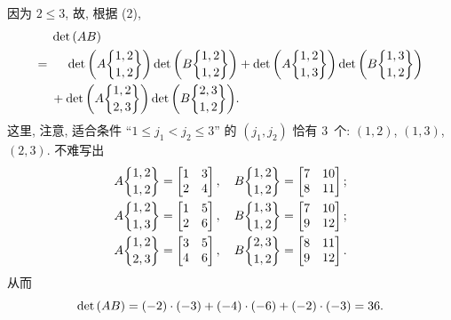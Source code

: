 \documentclass[../libro.tex]{subfiles}
\begin{document}
\begin{example}
    因为 \(2 \leq 3\), 故, 根据 (2),
    \begin{align*}
        & \det {(AB)}
        \\
        = {} &
        \hphantom{{} + {}}
        \det {\left(A\submat{1,2}{1,2}\right)}
        \det {\left(B\submat{1,2}{1,2}\right)}
        + \det {\left(A\submat{1,2}{1,3}\right)}
        \det {\left(B\submat{1,3}{1,2}\right)}
        \\
        &
        + \det {\left(A\submat{1,2}{2,3}\right)}
        \det {\left(B\submat{2,3}{1,2}\right)}.
    \end{align*}
    这里, 注意, 适合条件
    ``\(1 \leq j_1 < j_2 \leq 3\)''
    的 \((j_1, j_2)\)
    恰有 \(3\)~个:
    \((1, 2)\), \((1, 3)\), \((2, 3)\).
    不难写出
    \begin{align*}
        & A\submat{1,2}{1,2} =
        \begin{bmatrix}
            1&3\\2&4\\
        \end{bmatrix},
        \quad
        B\submat{1,2}{1,2} =
        \begin{bmatrix}
            7&10\\8&11\\
        \end{bmatrix}; \\
        & A\submat{1,2}{1,3} =
        \begin{bmatrix}
            1&5\\2&6\\
        \end{bmatrix},
        \quad
        B\submat{1,3}{1,2} =
        \begin{bmatrix}
            7&10\\9&12\\
        \end{bmatrix}; \\
        & A\submat{1,2}{2,3} =
        \begin{bmatrix}
            3&5\\4&6\\
        \end{bmatrix},
        \quad
        B\submat{2,3}{1,2} =
        \begin{bmatrix}
            8&11\\9&12\\
        \end{bmatrix}.
    \end{align*}
    从而
    \begin{equation*}
        \det {(AB)}
        = (-2) \cdot (-3) + (-4) \cdot (-6) + (-2) \cdot (-3)
        = 36.
        \qedhere
    \end{equation*}
\end{example}
\end{document}
